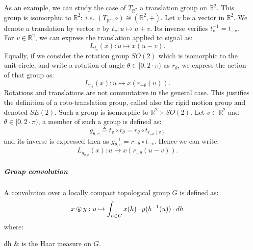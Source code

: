                     As an example, we can study the case of $T_{\mathbb{R}^2}$ a translation group on $\mathbb{R}^2$.
                    This group is isomorphic to $\mathbb{R}^2$: \textit{i.e.} $(T_{\mathbb{R}^2}, \circ) \cong (\mathbb{R}^2, +)$.
                    Let $v$ be a vector in $\mathbb{R}^2$.
                    We denote a translation by vector $v$ by $t_v: u \mapsto u + v$.
                    Its inverse verifies $t_v^{-1} = t_{-v}$.
                    For $v \in \mathbb{R}^2$, we can express the translation applied to signal as:
                    \begin{equation}
                        \label{eq::action_translation}
                        L_{t_v}(x): u \mapsto x\left(u - v\right).
                    \end{equation}
                    Equally, if we consider the rotation group $SO(2)$ which is isomorphic to the unit circle, and write a rotation of angle $\theta \in [0, 2\cdot\pi)$ as $r_{\theta}$, we express the action of that group as:
                    \begin{equation}
                        \label{eq::action_rotation}
                        L_{r_{\theta}}(x): u \mapsto x\left(r_{-\theta}(u)\right).
                    \end{equation}
                    Rotations and translations are not commutative in the general case.
                    This justifies the definition of a roto-translation group, called also the rigid motion group and denoted $SE(2)$.
                    Such a group is isomorphic to $\mathbb{R}^2 \times SO(2)$.
                    Let $v \in \mathbb{R}^2$ and $\theta \in [0, 2\cdot\pi)$, a member of such a group is defined as:
                    \begin{equation}
                        \label{eq::roto-translation}
                        g_{\theta, v} \triangleq t_v \circ r_{\theta} = r_{\theta} \circ t_{r_{-\theta}(v)}
                    \end{equation}
                    and its inverse is expressed then as $g_{\theta, v}^{-1} = r_{-\theta} \circ t_{-v}$.
                    Hence we can write:
                    \begin{equation}
                        \label{eq::action_roto-translation}
                        L_{g_{\theta, v}}(x): u \mapsto x \left(r_{-\theta}(u - v)\right).
                    \end{equation}
                
                \subparagraph{Group convolution}
                    A convolution over a locally compact topological group $G$ is defined as:
                    \begin{equation}
                        \label{eq::group_signal_convolution}
                        x \ostar y: u \mapsto \int_{h\in G} x(h)\cdot y(h^{-1}(u)) \cdot dh
                    \end{equation}
                    where:
                    \begin{conditions}
                        dh & is the Haar measure on $G$.
                    \end{conditions}

